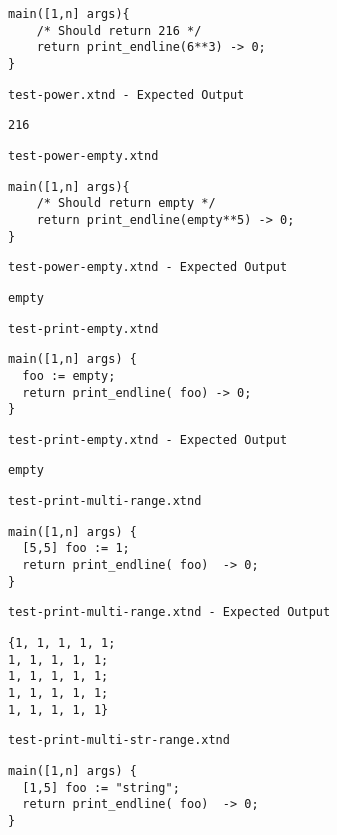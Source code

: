 \begin{lstlisting}
main([1,n] args){
	/* Should return 216 */
	return print_endline(6**3) -> 0;
}
\end{lstlisting}


\medskip \noindent \texttt{test-power.xtnd - Expected Output}


\begin{lstlisting}
216
\end{lstlisting}


\medskip \noindent \texttt{test-power-empty.xtnd}


\begin{lstlisting}
main([1,n] args){
	/* Should return empty */
	return print_endline(empty**5) -> 0;
}
\end{lstlisting}


\medskip \noindent \texttt{test-power-empty.xtnd - Expected Output}


\begin{lstlisting}
empty
\end{lstlisting}


\medskip \noindent \texttt{test-print-empty.xtnd}


\begin{lstlisting}
main([1,n] args) {
  foo := empty;
  return print_endline( foo) -> 0;
}
\end{lstlisting}


\medskip \noindent \texttt{test-print-empty.xtnd - Expected Output}


\begin{lstlisting}
empty
\end{lstlisting}


\medskip \noindent \texttt{test-print-multi-range.xtnd}


\begin{lstlisting}
main([1,n] args) {
  [5,5] foo := 1;
  return print_endline( foo)  -> 0;
}
\end{lstlisting}


\medskip \noindent \texttt{test-print-multi-range.xtnd - Expected Output}


\begin{lstlisting}
{1, 1, 1, 1, 1;
1, 1, 1, 1, 1;
1, 1, 1, 1, 1;
1, 1, 1, 1, 1;
1, 1, 1, 1, 1}
\end{lstlisting}


\medskip \noindent \texttt{test-print-multi-str-range.xtnd}


\begin{lstlisting}
main([1,n] args) {
  [1,5] foo := "string";
  return print_endline( foo)  -> 0;
}
\end{lstlisting}


